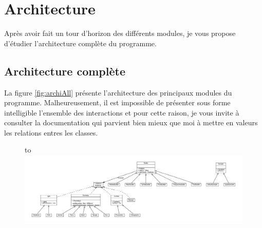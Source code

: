 \chapter{Architecture\label{sec:architecture}}
Après avoir fait un tour d'horizon des différents modules, je vous propose
d'étudier l'architecture complète du programme.


\clearpage

\clearpage

\clearpage

\clearpage

\clearpage

\clearpage

\clearpage

\section{Architecture complète}
La figure \ref{fig:archiAll} présente l'architecture des principaux modules du
programme. Malheureusement, il est impossible de présenter sous forme
intelligible l'ensemble des interactions et pour cette raison, je vous invite
à consulter la documentation  qui parvient bien mieux que moi à
mettre en valeurs les relations entres les classes.

\begin{figure}[p]
  \vspace*{-4cm}
  \hbox to \textwidth
  {\hss\includegraphics[angle=90,width=.6\textwidth]{../../architecture/LRT.pdf}\hss}
\end{figure}
